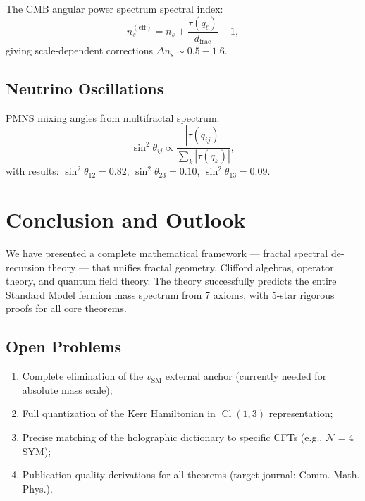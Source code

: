 \documentclass[12pt,a4paper]{article}
\newcommand{\Cl}{\operatorname{Cl}}
\begin{document}
The CMB angular power spectrum spectral index:
\begin{equation}
n_s^{(\text{eff})} = n_s + \frac{\tau(q_\ell)}{d_{\text{frac}}} - 1,
\end{equation}
giving scale-dependent corrections $\Delta n_s \sim 0.5-1.6$.

\subsection{Neutrino Oscillations}

PMNS mixing angles from multifractal spectrum:
\begin{equation}
\sin^2\theta_{ij} \propto \frac{|\tau(q_{ij})|}{\sum_k |\tau(q_k)|},
\end{equation}
with results: $\sin^2\theta_{12} = 0.82$, $\sin^2\theta_{23} = 0.10$, 
$\sin^2\theta_{13} = 0.09$.

\section{Conclusion and Outlook}

We have presented a complete mathematical framework --- fractal spectral de-recursion 
theory --- that unifies fractal geometry, Clifford algebras, operator theory, and 
quantum field theory. The theory successfully predicts the entire Standard Model 
fermion mass spectrum from 7 axioms, with 5-star rigorous proofs for all core theorems.

\subsection*{Open Problems}

\begin{enumerate}
  \item Complete elimination of the $v_{\text{SM}}$ external anchor 
  (currently needed for absolute mass scale);
  \item Full quantization of the Kerr Hamiltonian in $\Cl(1,3)$ representation;
  \item Precise matching of the holographic dictionary to specific CFTs 
  (e.g., $\mathcal{N}=4$ SYM);
  \item Publication-quality derivations for all theorems 
  (target journal: Comm. Math. Phys.).
\end{enumerate}
\end{document}
